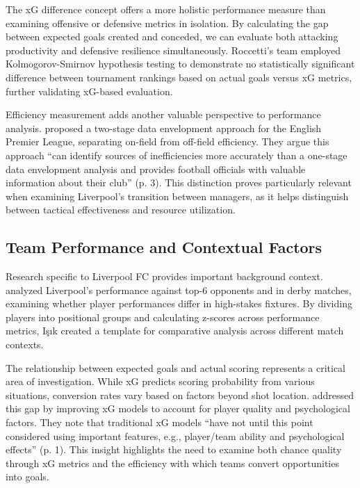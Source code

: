 \documentclass[12pt]{article}
\begin{document}
The xG difference concept offers a more holistic performance measure than examining offensive or defensive metrics in isolation. By calculating the gap between expected goals created and conceded, we can evaluate both attacking productivity and defensive resilience simultaneously. Roccetti's team employed Kolmogorov-Smirnov hypothesis testing to demonstrate no statistically significant difference between tournament rankings based on actual goals versus xG metrics, further validating xG-based evaluation.

Efficiency measurement adds another valuable perspective to performance analysis. \citet{kern2012} proposed a two-stage data envelopment approach for the English Premier League, separating on-field from off-field efficiency. They argue this approach ``can identify sources of inefficiencies more accurately than a one-stage data envelopment analysis and provides football officials with valuable information about their club'' (p. 3). This distinction proves particularly relevant when examining Liverpool's transition between managers, as it helps distinguish between tactical effectiveness and resource utilization.

\subsection*{Team Performance and Contextual Factors}

Research specific to Liverpool FC provides important background context. \citet{isik2020} analyzed Liverpool's performance against top-6 opponents and in derby matches, examining whether player performances differ in high-stakes fixtures. By dividing players into positional groups and calculating z-scores across performance metrics, Işık created a template for comparative analysis across different match contexts.

The relationship between expected goals and actual scoring represents a critical area of investigation. While xG predicts scoring probability from various situations, conversion rates vary based on factors beyond shot location. \citet{anzer2023} addressed this gap by improving xG models to account for player quality and psychological factors. They note that traditional xG models ``have not until this point considered using important features, e.g., player/team ability and psychological effects'' (p. 1). This insight highlights the need to examine both chance quality through xG metrics and the efficiency with which teams convert opportunities into goals.
\end{document}
